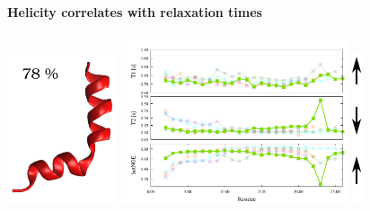\addtocounter{framenumber}{-1}
\begin{frame}
\LARGE{\centering
\textbf{Helicity correlates with relaxation times} \\}
\begin{center}
 \includegraphics[height=4.5cm]{plots/helix5.pdf}
 \includegraphics[height=5cm]{plots/simul_helix15.pdf}
 \includegraphics[height=4.5cm]{plots/arrows.pdf}
\end{center}
\end{frame}


